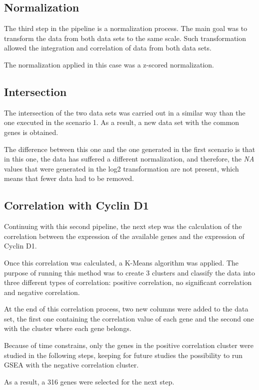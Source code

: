 \subsection{Normalization}
The third step in the pipeline is a normalization process. The main goal was to transform the data from both data sets to the same scale.
Such transformation allowed the integration and correlation of data from both data sets.

The normalization applied in this case was a z-scored normalization.

\subsection{Intersection}
The intersection of the two data sets was carried out in a similar way than the one executed in the scenario 1.
As a result, a new data set with the common genes is obtained.

The difference between this one and the one generated in the first scenario is that in this one, the data has suffered a different normalization, and therefore, the \textit{NA} values that were generated in the log2 transformation are not present, which means that fewer data had to be removed.

\subsection{Correlation with Cyclin D1}
Continuing with this second pipeline, the next step was the calculation of the correlation between the expression of the available genes and the expression of Cyclin D1.

Once this correlation was calculated, a K-Means algorithm was applied.
The purpose of running this method was to create 3 clusters and classify the data into three different types of correlation: positive correlation, no significant correlation and negative correlation.

At the end of this correlation process, two new columns were added to the data set, the first one containing the correlation value of each gene and the second one with the cluster where each gene belongs.

Because of time constrains, only the genes in the positive correlation cluster were studied in the following steps, keeping for future studies the possibility to run GSEA with the negative correlation cluster.

As a result, a 316 genes were selected for the next step.

